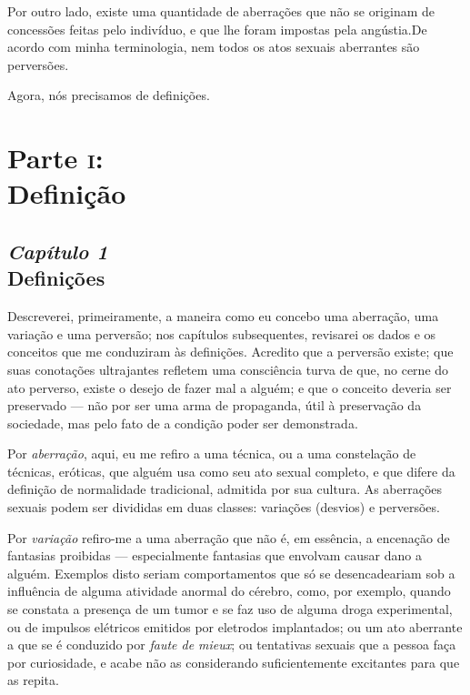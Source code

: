 Por outro lado, existe uma quantidade de aberrações que não se
originam de concessões feitas pelo indivíduo, e que lhe foram impostas
pela angústia.\idxangu[|)] De acordo com minha terminologia, nem todos os atos
sexuais aberrantes são perversões.

Agora, nós precisamos de definições.


\part[Parte \textsc{i}: Definição]{Parte \textsc{i}:\\ Definição}


\chapter[\textbf{1}\quad Definições]{{\large\textit{Capítulo 1}}\\ Definições}

Descreverei, primeiramente, a maneira como eu concebo uma aberração, uma
variação e uma perversão; nos capítulos subsequentes, revisarei os
dados e os conceitos que me conduziram às definições. Acredito que a
perversão existe; que suas conotações ultrajantes refletem uma
consciência turva de que, no cerne do ato perverso, existe o desejo de
fazer mal a alguém; e que o conceito deveria ser preservado --- não por
ser uma arma de propaganda, útil à preservação da sociedade, mas pelo
fato de a condição poder ser demonstrada.

Por \textit{aberração},\idxaberrdef{} aqui, eu me refiro a uma técnica, ou a uma
constelação de técnicas, eróticas, que alguém usa como seu ato sexual
completo, e que difere da definição de normalidade tradicional,
admitida por sua cultura. As aberrações sexuais podem ser divididas em
duas classes: variações (desvios) e perversões.

Por \textit{variação}\idxvariadefi{} refiro-me a uma aberração que não é, em
essência, a encenação de fantasias proibidas --- especialmente fantasias
que envolvam causar dano a alguém.\idxhost{} Exemplos disto seriam comportamentos
que só se desencadeariam sob a influência de alguma atividade anormal
do cérebro,\idxcerea{} como, por exemplo, quando se constata a presença de um
tumor e se faz uso de alguma droga experimental, ou de impulsos
elétricos emitidos por eletrodos implantados; ou um ato aberrante a que
se é conduzido por \textit{faute de mieux};\idxfaute{} ou tentativas sexuais que
a pessoa faça por curiosidade, e acabe não as considerando
suficientemente excitantes para que as repita.


